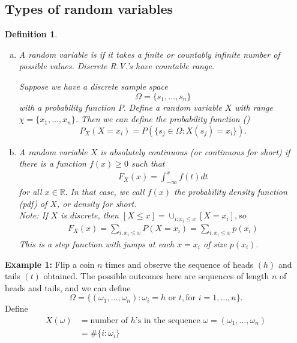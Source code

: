 \documentclass[12pt]{report} \addtolength{\textheight}{2in}
\newtheorem{defn}{Definition}
\newcommand{\Realnum}{\mathbb{R}}
\newcommand{\Tor}{\text{ or }}
\begin{document}
\subsection*{Types of random variables}
\begin{defn}
\begin{enumerate}[(a)]
\item A random variable is  if it takes a finite or countably infinite number of possible values. Discrete R.V.'s have countable range.

Suppose we have a discrete sample space
\begin{displaymath}
\Omega =\{s_1,\dots,s_n\}
\end{displaymath}
 with a probability function $P.$ Define a random variable  $X$ with range $\chi=\{x_1,\dots,x_n\}$. Then we can define the probability function ()
 \begin{displaymath}
 P_X(X=x_i)=P(\{s_j\in \Omega: X(s_j)=x_i\}).
 \end{displaymath}
 
\item A random variable $X$ is absolutely continuous (or continuous for short) if there is a function $f(x) \geq 0$ such that 
\begin{align*}
F_X(x)=\int_{-\infty} ^{x} f(t) dt
\end{align*}
for all $x\in \Realnum.$ In that case, we call $f(x)$ the probability density function (pdf) of $X$, or density for short.\\

Note: If $X$ is discrete, then $[X\leq x] =\cup_{i:x_i\leq x} [X=x_i], so$
\begin{align*}
F_{X}(x)=\sum_{i:x_i\leq x} P(X=x_i)=\sum_{i:x_i\leq x} p(x_i)
\end{align*}
This is a step function with jumps at each $x=x_i$ of size $p(x_i).$
\end{enumerate}
\end{defn}
\flushleft
 {\textbf{Example 1:}} Flip a coin $n$ times and observe the sequence of heads $(h)$ and tails $(t)$ obtained. The possible outcomes here are sequences of length $n$ of heads and tails, and we can define
 \begin{displaymath}
 \Omega=\{(\omega_1,\dots,\omega_n): \omega_i = h \Tor t, \text{for } i=1,\dots,n \}.
 \end{displaymath}
 Define
 \begin{align*}
 X(\omega) &= \text{number of $h$'s in the sequence $\omega=(\omega_1,\dots,\omega_n)$}\\
 &=\# \{i : \omega_{i}\}
 \end{align*} 
\end{document}
